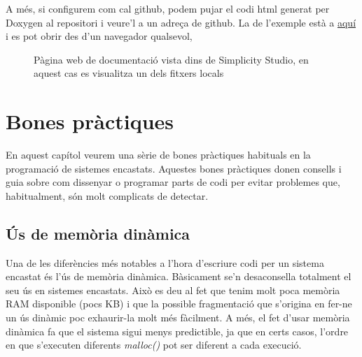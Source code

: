 A més, si configurem com cal github, podem pujar el codi html generat per Doxygen al repositori i veure'l a un adreça de github. La de l'exemple està a \href{https://mariusmm.github.io/cursembedded/Simplicity/FreeRTOS_1/Doc/html/}{aquí} \cite{GITHUBPages} i es pot obrir des d'un navegador qualsevol,

\begin{figure}
 \centering
 \caption{Pàgina web de documentació vista dins de Simplicity Studio, en aquest cas es visualitza un dels fitxers locals}
 \label{fig:doxygeneclipse}
\end{figure}

\chapter{Bones pràctiques}

En aquest capítol veurem una sèrie de bones pràctiques habituals en la programació de sistemes encastats. Aquestes bones pràctiques donen consells i guia sobre com dissenyar o programar parts de codi per evitar problemes que, habitualment, són molt complicats de detectar.

\section{Ús de memòria dinàmica}
Una de les diferències més notables a l'hora d'escriure codi per un sistema encastat és l'ús de memòria dinàmica. Bàsicament se'n desaconsella totalment el seu ús en sistemes encastats. Això es deu al fet que tenim molt poca memòria RAM disponible (pocs KB) i que la possible fragmentació que s'origina en fer-ne un ús dinàmic poc exhaurir-la molt més fàcilment. A més, el fet d'usar memòria dinàmica fa que el sistema sigui menys predictible, ja que en certs casos, l'ordre en que s'executen diferents {\em malloc()} pot ser diferent a cada execució.

